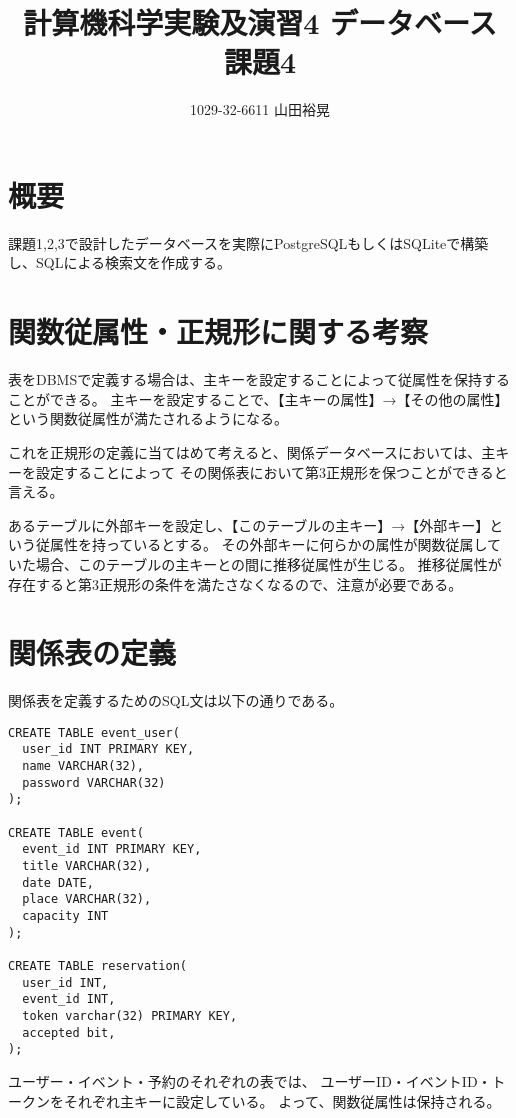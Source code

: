 \documentclass[dvipdfmx]{jarticle}
\begin{document}
\title{計算機科学実験及演習4 データベース 課題4}
\author{1029-32-6611 山田裕晃}
\maketitle

\section{概要}
課題1,2,3で設計したデータベースを実際にPostgreSQLもしくはSQLiteで構築し、SQLによる検索文を作成する。

\section{関数従属性・正規形に関する考察}

表をDBMSで定義する場合は、主キーを設定することによって従属性を保持することができる。
主キーを設定することで、【主キーの属性】→【その他の属性】という関数従属性が満たされるようになる。

これを正規形の定義に当てはめて考えると、関係データベースにおいては、主キーを設定することによって
その関係表において第3正規形を保つことができると言える。

あるテーブルに外部キーを設定し、【このテーブルの主キー】→【外部キー】という従属性を持っているとする。
その外部キーに何らかの属性が関数従属していた場合、このテーブルの主キーとの間に推移従属性が生じる。
推移従属性が存在すると第3正規形の条件を満たさなくなるので、注意が必要である。

\section{関係表の定義}

関係表を定義するためのSQL文は以下の通りである。

\begin{lstlisting}[caption=definition]
CREATE TABLE event_user(
  user_id INT PRIMARY KEY,
  name VARCHAR(32),
  password VARCHAR(32)
);

CREATE TABLE event(
  event_id INT PRIMARY KEY,
  title VARCHAR(32),
  date DATE,
  place VARCHAR(32),
  capacity INT
);

CREATE TABLE reservation(
  user_id INT,
  event_id INT,
  token varchar(32) PRIMARY KEY,
  accepted bit,
);
\end{lstlisting}

ユーザー・イベント・予約のそれぞれの表では、
ユーザーID・イベントID・トークンをそれぞれ主キーに設定している。
よって、関数従属性は保持される。
\end{document}
